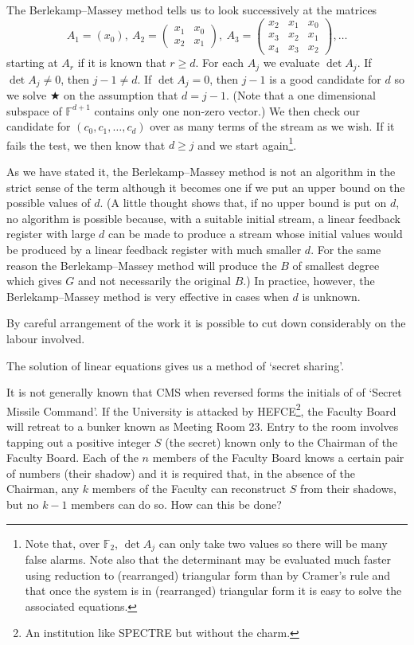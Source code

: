 The Berlekamp--Massey method
tells us to look successively
at the matrices
\[A_{1}=(x_{0}),
\ A_{2}=
\begin{pmatrix}
x_{1}&x_{0}\\
x_{2}&x_{1}
\end{pmatrix},
\ A_{3}=
\begin{pmatrix}
x_{2}&x_{1}&x_{0}\\
x_{3}&x_{2}&x_{1}\\
x_{4}&x_{3}&x_{2}
\end{pmatrix},
\dots
\]
starting at $A_{r}$ if it is known that $r\geq d$.
For each $A_{j}$ we evaluate $\det A_{j}$.
If $\det A_{j}\neq 0$, then $j-1\neq d$.
If $\det A_{j}=0$, then $j-1$ is a good candidate
for $d$ so we solve $\bigstar$ on the assumption that
$d=j-1$. (Note that a one dimensional subspace of
${\mathbb F}^{d+1}$ contains only one non-zero
vector.) We then check our candidate for
$(c_{0},c_{1},\dots,c_{d})$ over as many
terms of the stream as we wish. If it fails the
test, we then know that $d\geq j$ and we start
again\footnote{Note that, over ${\mathbb F}_{2}$,
$\det A_{j}$ can only take two values so there will
be many false alarms. Note also that the determinant
may be evaluated much faster using reduction to
(rearranged) triangular form than by Cramer's rule
and that once the system is in (rearranged) triangular form
it is easy to solve the associated equations.}.


As we have stated it, the Berlekamp--Massey method
is not an algorithm in the strict sense
of the term although it becomes one if we put an
upper bound on the possible values of $d$. (A little
thought shows that, if no upper bound is put on $d$,
no algorithm is possible because, with a suitable
initial stream, a linear feedback register with
large $d$ can be made to produce a stream whose
initial values would be produced by
a linear feedback register with much smaller $d$.
For the same reason the Berlekamp--Massey method
will produce the $B$ of smallest degree which
gives $G$ and not necessarily the original $B$.)
In practice, however, the Berlekamp--Massey method
is very effective in cases when $d$ is unknown.

By careful arrangement of the work it is possible
to cut down considerably  on the labour involved.

The solution of linear equations gives us
a method of `secret sharing'\label{P;secret sharing}.
\begin{problem} It is not generally known that
CMS when reversed forms the initials of 
of `Secret Missile Command'. If the University is
attacked by HEFCE\footnote{An institution like
SPECTRE but without the charm.}, the Faculty Board
will retreat to a bunker known as
Meeting Room 23. Entry to the room involves
tapping out a positive integer $S$ (the secret)
known only to the Chairman of the Faculty Board.
Each of the $n$ members of the Faculty Board
knows a certain pair of numbers (their shadow)
and it is required that, in the absence
of the Chairman, any $k$ members of the
Faculty can reconstruct $S$ from their shadows,
but no $k-1$ members can do so. How can this
be done?
\end{problem}

